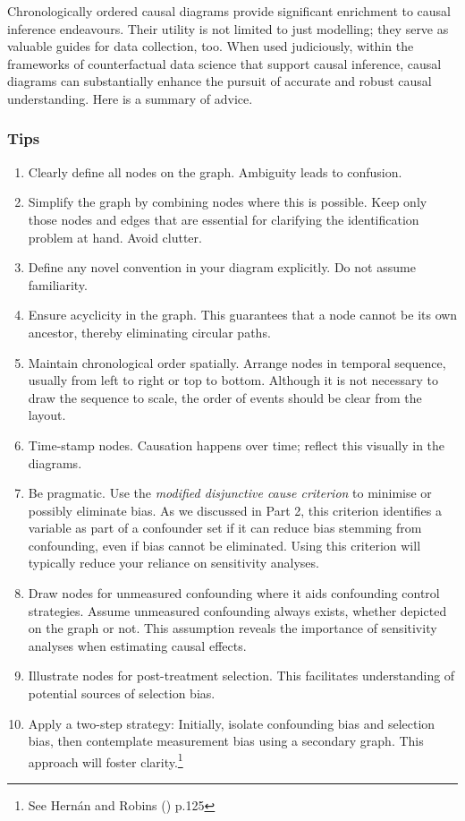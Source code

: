 \documentclass[
  singlecolumn]{article}
\begin{document}
Chronologically ordered causal diagrams provide significant enrichment
to causal inference endeavours. Their utility is not limited to just
modelling; they serve as valuable guides for data collection, too. When
used judiciously, within the frameworks of counterfactual data science
that support causal inference, causal diagrams can substantially enhance
the pursuit of accurate and robust causal understanding. Here is a
summary of advice.

\subsubsection{Tips}\label{tips}

\begin{enumerate}
\def\labelenumi{\arabic{enumi}.}
\item
  Clearly define all nodes on the graph. Ambiguity leads to confusion.
\item
  Simplify the graph by combining nodes where this is possible. Keep
  only those nodes and edges that are essential for clarifying the
  identification problem at hand. Avoid clutter.
\item
  Define any novel convention in your diagram explicitly. Do not assume
  familiarity.
\item
  Ensure acyclicity in the graph. This guarantees that a node cannot be
  its own ancestor, thereby eliminating circular paths.
\item
  Maintain chronological order spatially. Arrange nodes in temporal
  sequence, usually from left to right or top to bottom. Although it is
  not necessary to draw the sequence to scale, the order of events
  should be clear from the layout.
\item
  Time-stamp nodes. Causation happens over time; reflect this visually
  in the diagrams.
\item
  Be pragmatic. Use the \emph{modified disjunctive cause criterion} to
  minimise or possibly eliminate bias. As we discussed in Part 2, this
  criterion identifies a variable as part of a confounder set if it can
  reduce bias stemming from confounding, even if bias cannot be
  eliminated. Using this criterion will typically reduce your reliance
  on sensitivity analyses.
\item
  Draw nodes for unmeasured confounding where it aids confounding
  control strategies. Assume unmeasured confounding always exists,
  whether depicted on the graph or not. This assumption reveals the
  importance of sensitivity analyses when estimating causal effects.
\item
  Illustrate nodes for post-treatment selection. This facilitates
  understanding of potential sources of selection bias.
\item
  Apply a two-step strategy: Initially, isolate confounding bias and
  selection bias, then contemplate measurement bias using a secondary
  graph. This approach will foster clarity.\footnote{See Hernán and
    Robins () p.125}
\end{enumerate}
\end{document}
